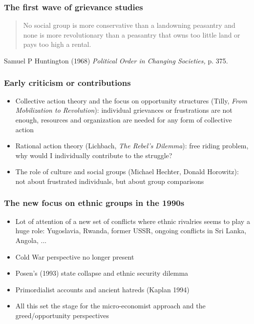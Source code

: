 \documentclass[aspectratio=43]{beamer}
\begin{document}
\begin{frame}
\frametitle{The first wave of grievance studies}
\centering

\begin{quote}
No social group is more conservative than a landowning peasantry and none is more revolutionary than a peasantry that owns too little land or pays too high a rental.
\end{quote}

\vspace{10pt}

{\footnotesize Samuel P Huntington (1968) \textit{Political Order in Changing Societies,} p. 375.}

\end{frame}

\begin{frame}
\frametitle{Early criticism or contributions}
\centering

\begin{itemize}
  \item Collective action theory and the focus on opportunity structures (Tilly, \textit{From Mobilization to Revolution}): individual grievances or frustrations are not enough, resources and organization are needed for any form of collective action
  \item Rational action theory (Lichbach, \textit{The Rebel's Dilemma}): free riding problem, why would I individually contribute to the struggle?
  \item The role of culture and social groups (Michael Hechter, Donald Horowitz): not about frustrated individuals, but about group comparisons
\end{itemize}

\end{frame}

\begin{frame}
\frametitle{The new focus on ethnic groups in the 1990s}
\centering

\begin{itemize}
  \item Lot of attention of a new set of conflicts where ethnic rivalries seems to play a huge role: Yugoslavia, Rwanda, former USSR, ongoing conflicts in Sri Lanka, Angola, ...
  \item Cold War perspective no longer present
  \item Posen's (1993) state collapse and ethnic security dilemma
  \item Primordialist accounts and ancient hatreds (Kaplan 1994)
  \item All this set the stage for the micro-economist approach and the greed/opportunity perspectives
\end{itemize}

\end{frame}
\end{document}
